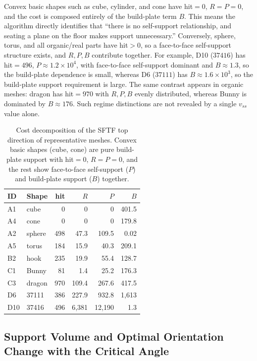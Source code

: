 \documentclass[11pt,a4paper]{article}
\begin{document}
Convex basic shapes such as cube, cylinder, and cone have hit$=0$, $R=P=0$, and the cost is
composed entirely of the build-plate term $B$.
This means the algorithm directly identifies that ``there is no self-support relationship, and seating a plane on the floor makes support unnecessary.''
Conversely, sphere, torus, and all organic/real parts have hit$>0$, so a face-to-face self-support structure exists,
and $R,P,B$ contribute together.
For example, D10 ($37416$) has hit$=496$, $P\approx1.2\times10^4$, with face-to-face self-support dominant
and $B\approx1.3$, so the build-plate dependence is small, whereas
D6 ($37111$) has $B\approx1.6\times10^3$, so the build-plate support requirement is large.
The same contrast appears in organic meshes: dragon has hit$=970$ with $R,P,B$ evenly distributed, whereas
Bunny is dominated by $B\approx176$.
Such regime distinctions are not revealed by a single $v_{ss}$ value alone.

\begin{table}[H]
\centering
\caption{Cost decomposition of the SFTF top direction of representative meshes.
Convex basic shapes (cube, cone) are pure build-plate support with hit$=0$, $R=P=0$,
and the rest show face-to-face self-support ($P$) and build-plate support ($B$) together.}
\label{tab:fivegroup-structure}
\begin{tabular}{llrrrr}
\toprule
ID & Shape & hit & $R$ & $P$ & $B$\\
\midrule
A1  & cube     & 0   & 0       & 0        & 401.5\\
A4  & cone     & 0   & 0       & 0        & 179.8\\
A2  & sphere   & 498 & 47.3    & 109.5    & 0.02\\
A5  & torus    & 184 & 15.9    & 40.3     & 209.1\\
B2  & hook     & 235 & 19.9    & 55.4     & 128.7\\
C1  & Bunny    & 81  & 1.4     & 25.2     & 176.3\\
C3  & dragon   & 970 & 109.4   & 267.6    & 417.5\\
D6  & 37111    & 386 & 227.9   & 932.8    & 1{,}613\\
D10 & 37416    & 496 & 6{,}381 & 12{,}190 & 1.3\\
\bottomrule
\end{tabular}
\end{table}

\subsection{Support Volume and Optimal Orientation Change with the Critical Angle}
\label{sec:critangle}
\end{document}
